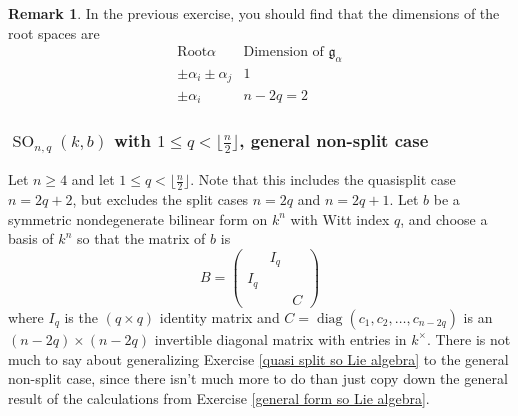 \documentclass[12pt]{article}
\theoremstyle{definition}
\newtheorem{remark}[theorem]{Remark}
\numberwithin{theorem}{subsection}
\newcommand{\frakg}{\mathfrak{g}}
\DeclareMathOperator{\SO}{SO}
\DeclareMathOperator{\diag}{diag}
\begin{document}
\begin{remark}
In the previous exercise, you should find that the dimensions of the root spaces are
\[
	\begin{array}{c|c}
		\text{Root} \alpha & \text{Dimension of } \frakg_\alpha \\
		\hline
		\pm \alpha_i \pm \alpha_j & 1 \\
		\pm \alpha_i & n-2q = 2
	\end{array}
\]
\end{remark}

\subsubsection{$\SO_{n,q}(k,b)$ with $1 \le q < \lfloor \frac{n}{2} \rfloor$, general non-split case}

Let $n \ge 4$ and let $1 \le q < \lfloor \frac{n}{2} \rfloor$. Note that this includes the quasisplit case $n=2q+2$, but excludes the split cases $n=2q$ and $n=2q+1$. Let $b$ be a symmetric nondegenerate bilinear form on $k^n$ with Witt index $q$, and choose a basis of $k^n$ so that the matrix of $b$ is
\[
	B = 
	\begin{pmatrix}
		& I_q \\
		I_q \\
		&& C
	\end{pmatrix}
\]
where $I_q$ is the $(q \times q)$ identity matrix and $C = \diag(c_1, c_2, \ldots, c_{n-2q})$ is an $(n-2q) \times (n-2q)$ invertible diagonal matrix with entries in $k^\times$. There is not much to say about generalizing Exercise \ref{quasi split so Lie algebra} to the general non-split case, since there isn't much more to do than just copy down the general result of the calculations from Exercise \ref{general form so Lie algebra}.
\end{document}
